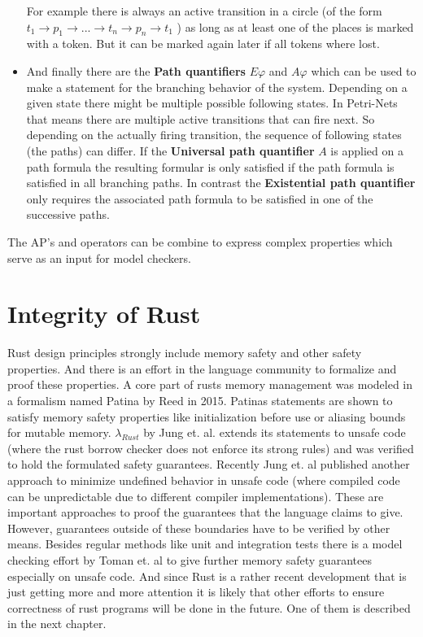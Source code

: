 \begin{itemize}
  For example there is always an active transition in a circle (of the form $t_1\rightarrow p_1 \rightarrow ... \rightarrow t_n \rightarrow p_n \rightarrow t_1$ ) as long as at least one of the places is marked with a token.
  But it can be marked again later if all tokens where lost.
  \item And finally there are the \textbf{Path quantifiers} $E\varphi$ and $A\varphi$ which can be used to make a statement for the branching behavior of the system.
  Depending on a given state there might be multiple possible following states.
  In Petri-Nets that means there are multiple active transitions that can fire next.
  So depending on the actually firing transition, the sequence of following states (the paths) can differ.
  If the \textbf{Universal path quantifier} $A$ is applied on a path formula the resulting formular is only satisfied if the path formula is satisfied in all branching paths.
  In contrast the \textbf{Existential path quantifier} only requires the associated path formula to be satisfied in one of the successive paths.
\end{itemize}
The AP's and operators can be combine to express complex properties which serve as an input for model checkers.



\section{Integrity of Rust}
Rust design principles strongly include memory safety and other safety properties.
And there is an effort in the language community to formalize and proof these properties.
A core part of rusts memory management was modeled in a formalism named Patina by Reed\cite{reed2015patina} in 2015.
Patinas statements are shown to satisfy memory safety properties like initialization before use or aliasing bounds for mutable memory.
$\lambda_{Rust}$ by Jung et. al.\cite{Jung:2017:RSF:3177123.3158154} extends its statements to unsafe code (where the rust borrow checker does not enforce its strong rules) and was verified to hold the formulated safety guarantees.
Recently Jung et. al published another approach to minimize undefined behavior in unsafe code (where compiled code can be unpredictable due to different compiler implementations).
These are important approaches to proof the guarantees that the language claims to give.
However, guarantees outside of these boundaries have to be verified by other means.
Besides regular methods like unit and integration tests there is a model checking effort by Toman et. al \cite{toman2015crust} to give further memory safety guarantees especially on unsafe code.
And since Rust is a rather recent development that is just getting more and more attention it is likely that other efforts to ensure correctness of rust programs will be done in the future.
One of them is described in the next chapter.